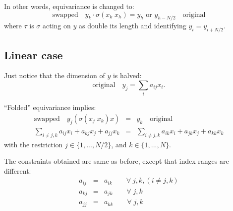 In other words, equivariance is changed to:
\begin{equation}
\boxed{\mbox{swapped}} \quad y_k \cdot \sigma(x_k \; x_h) = y_h \mbox{  or  } y_{h-N/2} \quad \boxed{\mbox{original}} \end{equation}
where $\tau$ is $\sigma$ acting on $y$ as double its length and identifying $y_i = y_{i + N/2}$.

\subsection{Linear case}

Just notice that the dimension of $y$ is halved:
\begin{equation}
\boxed{\mbox{original}} \quad y_j = \sum_i a_{ij} x_i .
\end{equation}

``Folded'' equivariance implies:
\begin{eqnarray}
\boxed{\mbox{swapped}} \quad y_j ( \sigma(x_j \; x_k) x) %
&=& y_k \quad \boxed{\mbox{original}} \\
\sum_{i \neq j,k} a_{ij} x_i + a_{kj} x_j + a_{jj} x_k &=& \sum_{i \neq j,k} a_{ik} x_i + a_{jk} x_j + a_{kk} x_k  \nonumber
\end{eqnarray}
with the restriction $j \in \{ 1,..., N/2 \}$, and $k \in \{ 1,..., N \}$.

The constraints obtained are same as before, except that index ranges are different:
\begin{eqnarray}
a_{ij} &=& a_{ik} \quad \quad \forall \;  j, k, (i \neq j, k) \nonumber \\
a_{kj} &=& a_{jk} \quad \quad \forall \;  j, k \nonumber \\
a_{jj} &=& a_{kk} \quad \quad \forall \;  j, k \nonumber
\end{eqnarray}

